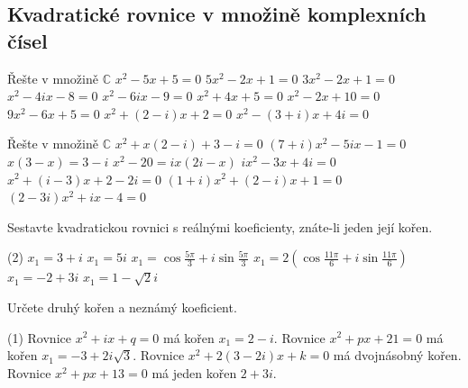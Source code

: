 
\subsection*{Kvadratické rovnice v množině komplexních čísel}

\begin{exerciseblock}[2]{Řešte v množině $\mathbb{C}$}
    \task $x^2-5x+5=0$
    \task $5x^2-2x+1=0$
    \task $3x^2-2x+1=0$
    \task $x^2-4ix-8=0$
    \task $x^2-6ix-9=0$
    \task $x^2+4x+5=0$
    \task $x^2-2x+10=0$
    \task $9x^2-6x+5=0$
    \task $x^2+(2-i)x+2=0$
    \task $x^2-(3+i)x+4i=0$
\end{exerciseblock}


\begin{exerciseblock}[2]{Řešte v množině $\mathbb{C}$}
    \task $x^2+x(2-i)+3-i=0$
    \task $(7+i)x^2-5ix-1=0$
    \task $x(3-x)=3-i$
    \task $x^2-20=ix(2i-x)$
    \task $ix^2-3x+4i=0$
    \task $x^2+(i-3)x+2-2i=0$
    \task $(1+i)x^2+(2-i)x+1=0$
    \task $(2-3i)x^2+ix-4=0$
\end{exerciseblock}


\begin{exercise}{Sestavte kvadratickou rovnici s reálnými koeficienty, znáte-li jeden její kořen.}
    \begin{tasks}(2)
        \task $x_1=3+i$
        \task $x_1=5i$
        \task $\displaystyle x_1=\cos\frac{5\pi}{3}+i\sin\frac{5\pi}{3}$
        \task $\displaystyle x_1=2\left(\cos\frac{11\pi}{6}+i\sin\frac{11\pi}{6}\right)$
        \task $x_1=-2+3i$
        \task $x_1=1-\sqrt2 i$
    \end{tasks}
\end{exercise}


\begin{exercise}{Určete druhý kořen a neznámý koeficient.}
    \begin{tasks}(1)
        \task Rovnice $x^2+ix+q=0$ má kořen $x_1=2-i$.
        \task Rovnice $x^2+px+21=0$ má kořen $x_1=-3+2i\sqrt3$.
        \task Rovnice $x^2+2(3-2i)x+k=0$ má dvojnásobný kořen.
        \task Rovnice $x^2+px+13=0$ má jeden kořen $2+3i$.
    \end{tasks}
\end{exercise}



